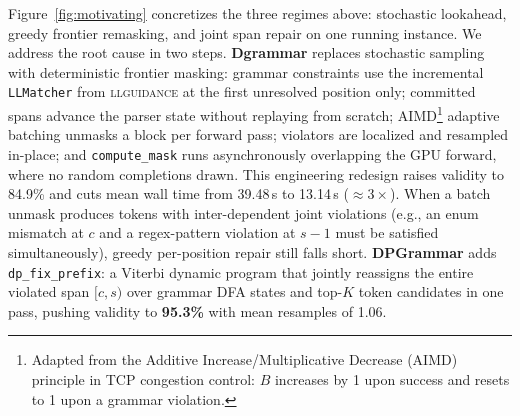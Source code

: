 Figure~\ref{fig:motivating} concretizes the three regimes above: stochastic lookahead, greedy frontier remasking, and joint span repair on one running instance. We address the root cause in two steps. \textbf{Dgrammar} replaces stochastic sampling with deterministic frontier masking: grammar constraints use the incremental \texttt{LLMatcher} from \textsc{llguidance} \citep{microsoft2025llguidance} at the first unresolved position only; committed spans advance the parser state without replaying from scratch; AIMD\footnote{Adapted from the Additive Increase/Multiplicative Decrease (AIMD) principle in TCP congestion control: $B$ increases by 1 upon success and resets to 1 upon a grammar violation.} adaptive batching unmasks a block per forward pass; violators are localized and resampled in-place; and \texttt{compute\_mask} runs asynchronously overlapping the GPU forward, where no random completions drawn. This engineering redesign raises validity to 84.9\% and cuts mean wall time from 39.48\,s to 13.14\,s ($\approx\!3\times$). When a batch unmask produces tokens with inter-dependent joint violations (e.g., an enum mismatch at $c$ and a regex-pattern violation at $s{-}1$ must be satisfied simultaneously), greedy per-position repair still falls short. \textbf{DPGrammar} adds \texttt{dp\_fix\_prefix}: a Viterbi dynamic program that jointly reassigns the entire violated span $[c,s)$ over grammar DFA states and top-$K$ token candidates in one pass, pushing validity to \textbf{95.3\%} with mean resamples of 1.06.



